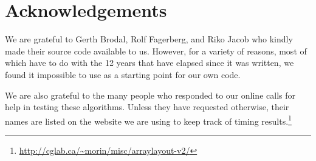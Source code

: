\documentclass{patmorin}
\begin{document}
%
%
%

\section*{Acknowledgements}

We are grateful to  Gerth Brodal, Rolf Fagerberg, and Riko Jacob who
kindly made their source code available to us. However, for a variety
of reasons, most of which have to do with the 12 years that have elapsed
since it was written, we found it impossible to use as a starting point
for our own code.

We are also grateful to the many people who responded to
our online calls for help in testing these algorithms.
Unless they have requested otherwise, their names are
listed on the website we are using to keep track of timing
results.\footnote{\url{http://cglab.ca/~morin/misc/arraylayout-v2/}}




\end{document}
